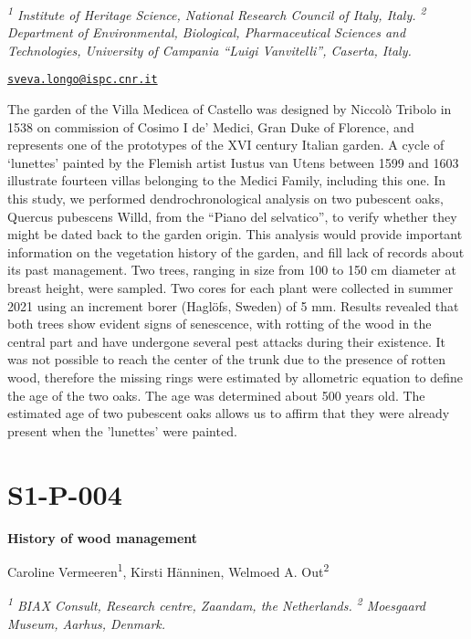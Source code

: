 \documentclass[
]{book}
\begin{document}
\emph{\textsuperscript{1} Institute of Heritage Science, National Research Council of Italy, Italy. \textsuperscript{2} Department of Environmental, Biological, Pharmaceutical Sciences and Technologies, University of Campania ``Luigi Vanvitelli'', Caserta, Italy.}

\href{mailto:sveva.longo@ispc.cnr.it}{\nolinkurl{sveva.longo@ispc.cnr.it}}

The garden of the Villa Medicea of Castello was designed by Niccolò Tribolo in 1538 on commission of Cosimo I de' Medici, Gran Duke of Florence, and represents one of the prototypes of the XVI century Italian garden. A cycle of `lunettes' painted by the Flemish artist Iustus van Utens between 1599 and 1603 illustrate fourteen villas belonging to the Medici Family, including this one. In this study, we performed dendrochronological analysis on two pubescent oaks, Quercus pubescens Willd, from the ``Piano del selvatico'', to verify whether they might be dated back to the garden origin. This analysis would provide important information on the vegetation history of the garden, and fill lack of records about its past management. Two trees, ranging in size from 100 to 150 cm diameter at breast height, were sampled. Two cores for each plant were collected in summer 2021 using an increment borer (Haglöfs, Sweden) of 5 mm. Results revealed that both trees show evident signs of senescence, with rotting of the wood in the central part and have undergone several pest attacks during their existence. It was not possible to reach the center of the trunk due to the presence of rotten wood, therefore the missing rings were estimated by allometric equation to define the age of the two oaks. The age was determined about 500 years old. The estimated age of two pubescent oaks allows us to affirm that they were already present when the 'lunettes' were painted.

\hypertarget{s1-p-004}{%
\section*{S1-P-004}\label{s1-p-004}}

\textbf{History of wood management}

Caroline Vermeeren\textsuperscript{1}, Kirsti Hänninen, Welmoed A. Out\textsuperscript{2}

\emph{\textsuperscript{1} BIAX Consult, Research centre, Zaandam, the Netherlands. \textsuperscript{2} Moesgaard Museum, Aarhus, Denmark.}
\end{document}
